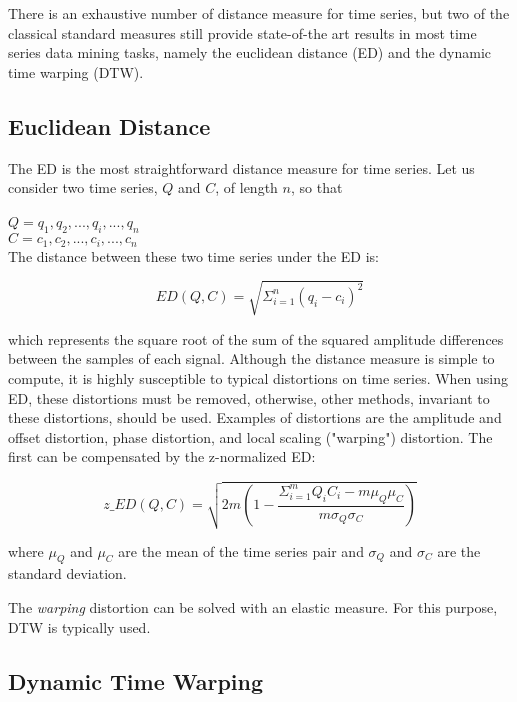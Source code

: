 There is an exhaustive number of distance measure for time series, but two of the classical standard measures still provide state-of-the art results in most time series data mining tasks, namely the euclidean distance (ED) and the dynamic time warping (DTW).
\par

\subsection{Euclidean Distance}
\label{subsec:ed}

The ED is the most straightforward distance measure for time series. Let us consider two time series, $Q$ and $C$, of length $n$, so that\\
\\
$Q = q_1, q_2, ..., q_i, ..., q_n$\\
$C = c_1, c_2, ..., c_i, ..., c_n$\\

The distance between these two time series under the ED is:

\begin{equation}
ED(Q,C) = \sqrt{\Sigma^n_{i=1} (q_i - c_i)^2}
\end{equation}

which represents the square root of the sum of the squared amplitude differences between the samples of each signal. Although the distance measure is simple to compute, it is highly susceptible to typical distortions on time series. When using ED, these distortions must be removed, otherwise, other methods, invariant to these distortions, should be used. Examples of distortions are the amplitude and offset distortion, phase distortion, and local scaling ("warping") distortion. The first can be compensated by the z-normalized ED:

\begin{equation}
\label{eq:norm_ed}
z\_ED(Q,C) = \sqrt{2m(1-\frac{\Sigma^m_{i=1}Q_iC_i - m\mu_Q\mu_C}{m\sigma_Q\sigma_C})}
\end{equation}

where $\mu_Q$ and $\mu_C$ are the mean of the time series pair and $\sigma_Q$ and $\sigma_C$ are the standard deviation.

The \textit{warping} distortion can be solved with an elastic measure. For this purpose, DTW is typically used.

\subsection{Dynamic Time Warping}
\label{subsec:dtw}

